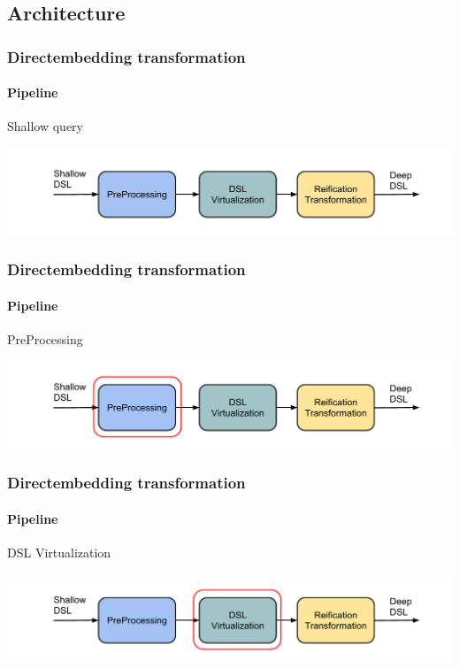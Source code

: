 \documentclass[xcolor=dvipsnames]{beamer}
\theoremstyle{definition}
\begin{document}
\subsection{Architecture} %
\label{sub:Architecture}

\begin{frame}[fragile]
    \frametitle{Directembedding transformation}
    \framesubtitle{Pipeline}
    \begin{block}{Shallow query}
        
    \end{block}
    \begin{center}
        \includegraphics[width=\textwidth]{img/pipeline1.pdf}
    \end{center}
\end{frame}

\begin{frame}[fragile]
    \frametitle{Directembedding transformation}
    \framesubtitle{Pipeline}
    \begin{block}{PreProcessing}
        
    \end{block}
    \begin{center}
        \includegraphics[width=\textwidth]{img/pipeline2.pdf}
    \end{center}
\end{frame}


\begin{frame}[fragile]
    \frametitle{Directembedding transformation}
    \framesubtitle{Pipeline}
    \begin{block}{DSL Virtualization}
        
    \end{block}
    \begin{center}
        \includegraphics[width=\textwidth]{img/pipeline3.pdf}
    \end{center}
\end{frame}
\end{document}

